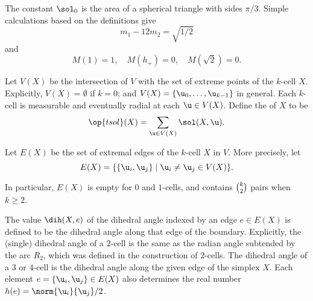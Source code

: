 The constant $\sol_0$
is the area of a spherical triangle with sides $\pi/3$.
Simple calculations based on the definitions give
\begin{equation}\label{eqn:km}m_1 - 12m_2 = \sqrt{1/2}\end{equation} 
and
\begin{equation}M(1) = 1,\quad M(h_+)=0,\quad M(\sqrt2) =0.\end{equation} 

\begin{definition}[$V(X)$,~$\op{tsol}$] 
  Let $V(X)$ be the intersection of $ V$ with the set of extreme
  points of the $k$-cell $X$.  Explicitly, $V(X)=\emptyset$ if $k=0$;
  and $V(X) = \{ \u_0,\ldots, \u_{k-1}\}$ in general.  Each $k$-cell
  is measurable and eventually radial at each $\u\in V(X)$.  Define
  the  of $X$ to be
\begin{displaymath} 
\op{tsol}(X) = \sum_{ \u\in V(X)} \sol(X, \u).
\end{displaymath}
\end{definition}
%
%
%

\begin{definition} 
Let $E(X)$ be the set of extremal edges of the $k$-cell $X$ in $ V$.
More precisely, let
\begin{displaymath}E(X)=\{\{ \u_i, \u_j\}\mid \u_i\ne \u_j\in
V(X)\}.\end{displaymath}
%
\end{definition}

In particular, $E(X)$ is empty for $0$ and $1$-cells, and contains
$\tbinom{k}{2}$ pairs when $k\ge 2$.

\begin{definition}[$\dih(X,e)$,~$h$] 
The value $\dih(X,e)$ of the dihedral angle indexed by an edge $e\in
E(X)$ is defined to be the dihedral angle along that edge of the
boundary.  Explicitly, the (single) dihedral angle of a $2$-cell is the same as
the radian angle subtended by the arc $R_2$, which was defined in the
construction of $2$-cells.  The dihedral angle of a $3$ or $4$-cell is
the dihedral angle along the given edge of the simplex $X$.
%
%
Each
element $e=\{ \u_i, \u_j\}\in E(X)$ also determines the real number
$h(e) = \norm{ \u_i}{ \u_j}/2$.
\end{definition}


